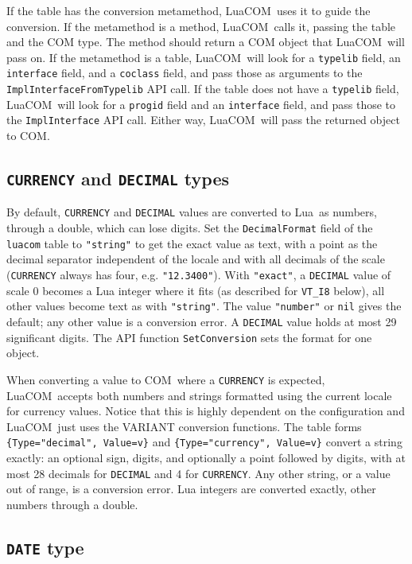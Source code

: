 \documentclass[11pt,a4paper,english]{report}
\newcommand{\ident}[1]{\mbox{\texttt{#1}}}
\newcommand{\techname}[1]{\mbox{#1}}
\newcommand{\lua}{\techname{Lua}}
\newcommand{\com}{\techname{COM}}
\newcommand{\luacom}{\techname{LuaCOM}}
\begin{document}
If the table has the conversion metamethod, \luacom\ uses it
to guide the conversion. If the metamethod is a method, \luacom\
calls it, passing the table and the COM type. The method should return a COM object
that \luacom\ will pass on. If the metamethod is a table, \luacom\ will
look for a \verb+typelib+ field, an \verb+interface+ field, and a \verb+coclass+ field,
and pass those as arguments to the \verb+ImplInterfaceFromTypelib+ API call. If the table
does not have a \verb+typelib+ field, \luacom\ will look for a \verb+progid+ field and
an \verb+interface+ field, and pass those to the \verb+ImplInterface+ API call. Either way,
\luacom\ will pass the returned object to COM.

\subsection{\ident{CURRENCY} and \ident{DECIMAL} types}
By default, \ident{CURRENCY} and \ident{DECIMAL} values are converted
to \lua\ as numbers, through a double, which can lose digits. Set the
\verb+DecimalFormat+ field of the \verb+luacom+ table to
\verb+"string"+ to get the exact value as text, with a point as the
decimal separator independent of the locale and with all decimals of
the scale (\ident{CURRENCY} always has four, e.g. \verb+"12.3400"+).
With \verb+"exact"+, a \ident{DECIMAL} value of scale 0 becomes a Lua
integer where it fits (as described for \verb+VT_I8+ below), all other
values become text as with \verb+"string"+. The value \verb+"number"+
or \verb+nil+ gives the default; any other value is a conversion
error. A \ident{DECIMAL} value holds at most 29 significant digits. The
API function \verb+SetConversion+ sets the format for one object.

When converting a value to \com\ where a \ident{CURRENCY} is expected,
\luacom\ accepts both numbers and strings formatted using the current
locale for currency values. Notice that this is highly dependent on
the configuration and \luacom\ just uses the VARIANT conversion
functions. The table forms \verb+{Type="decimal", Value=v}+ and
\verb+{Type="currency", Value=v}+ convert a string exactly: an optional
sign, digits, and optionally a point followed by digits, with at most 28
decimals for \ident{DECIMAL} and 4 for \ident{CURRENCY}. Any other
string, or a value out of range, is a conversion error. Lua integers
are converted exactly, other numbers through a double.

\subsection{\ident{DATE} type}
\end{document}

